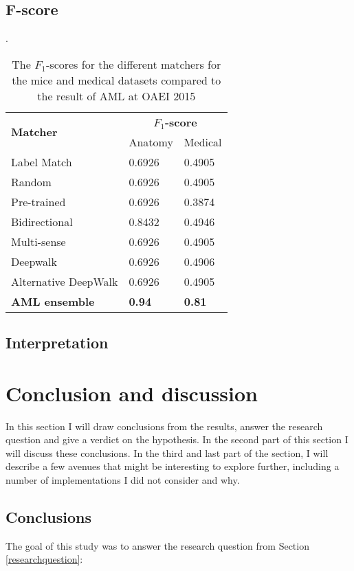 \documentclass{article}
\begin{document}
  \subsection{F-score}
  \begin{table}[H]
  \caption[$F_1$]{The $F_1$-scores for the different matchers for the mice and medical datasets compared to the result of AML at OAEI 2015 \cite{oaei2015}}.
  \label{fscores}
  \begin{tabular}{l|ll}
  \multirow{2}{*}{\textbf{Matcher}} & \multicolumn{2}{c}{\textbf{$F_1$-score}} \\
  & Anatomy & Medical\\
  \hline
  Label Match & 0.6926 & 0.4905 \\
  Random & 0.6926 & 0.4905 \\
  Pre-trained & 0.6926 & 0.3874 \\
  Bidirectional & 0.8432 & 0.4946 \\
  Multi-sense & 0.6926 & 0.4905 \\
  Deepwalk & 0.6926 & 0.4906 \\
  Alternative DeepWalk & 0.6926 & 0.4905 \\
  \textbf{AML ensemble} & \textbf{0.94} & \textbf{0.81} \\
  \end{tabular}
  \end{table}
   
 \newpage
 \subsection{Interpretation}
 
 
  
 \newpage
 \section{Conclusion and discussion}
 In this section I will draw conclusions from the results, answer the research question and give a verdict on the hypothesis. In the second part of this section I will discuss these conclusions. In the third and last part of the section, I will describe a few avenues that might be interesting to explore further, including a number of implementations I did not consider and why.
 
 \subsection{Conclusions} \label{conclusions}
 The goal of this study was to answer the research question from Section \ref{researchquestion}:
\end{document}
